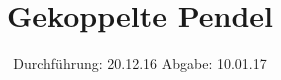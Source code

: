 

\subject{V106}
\title{Gekoppelte Pendel}
\date{
  Durchführung: 20.12.16
  \hspace{3em}
  Abgabe: 10.01.17
}



\maketitle
\thispagestyle{empty}
\tableofcontents
\newpage






\printbibliography



